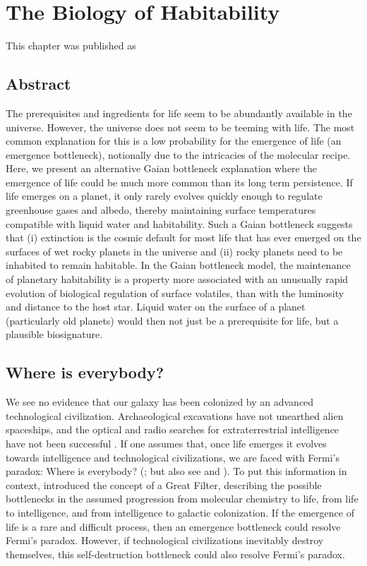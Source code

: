 \chapter{The Biology of Habitability}\label{ch:biologicalhab}
This chapter was published as
\begin{description}
	\item {}
\end{description}
\bigskip
\section*{Abstract}
The prerequisites and ingredients for life seem to be abundantly available in the universe. However, the universe does not seem to be teeming with life. The most common explanation for this is a low probability for the emergence of life (an emergence bottleneck), notionally due to the intricacies of the molecular recipe. Here, we present an alternative Gaian bottleneck explanation where the emergence of life could be much more common than its long term persistence. If life emerges on a planet, it only rarely evolves quickly enough to regulate greenhouse gases and albedo, thereby maintaining surface temperatures compatible with liquid water and habitability. Such a Gaian bottleneck suggests that (i) extinction is the cosmic default for most life that has ever emerged on the surfaces of wet rocky planets in the universe and (ii) rocky planets need to be inhabited to remain habitable.
In the Gaian bottleneck model, the maintenance of planetary habitability is a property more associated with an unusually rapid evolution of biological regulation of surface volatiles, than with the luminosity and distance to the host star.  Liquid water on the surface of a planet (particularly old planets) would then not just be a prerequisite for life, but a plausible biosignature.
\clearpage

\section{Where is everybody?}

We see no evidence that our galaxy has been colonized by an advanced technological civilization.
Archaeological excavations have not unearthed alien spaceships, and the optical and radio searches for extraterrestrial intelligence have not been successful \citep{Tarter2001}. 
If one assumes that, once life emerges it evolves towards intelligence and technological civilizations, we are faced with Fermi's paradox: Where is everybody? (\citet{Webb2002,Cirkovic2009}; but also see \citet{Gray2015} and \citet{Ward2000}).
To put this information in context, \citet{Hanson1998} introduced the concept of a Great Filter, describing the possible bottlenecks in the assumed progression from molecular chemistry to life, from life to intelligence, and from intelligence to galactic colonization.
If the emergence of life is a rare and difficult process, then an emergence bottleneck could resolve Fermi's paradox.
However, if technological civilizations inevitably destroy themselves, this self-destruction bottleneck could also resolve Fermi's paradox.

